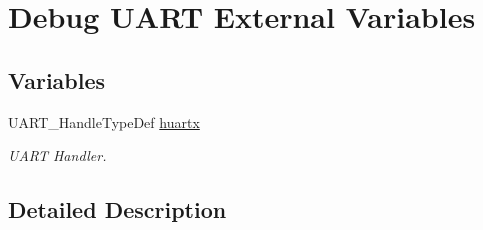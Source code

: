 \hypertarget{group___debug___u_a_r_t___external___variables}{}\section{Debug U\+A\+RT External Variables}
\label{group___debug___u_a_r_t___external___variables}
\subsection*{Variables}
\begin{DoxyCompactItemize}
\item 
U\+A\+R\+T\+\_\+\+Handle\+Type\+Def \hyperlink{group___debug___u_a_r_t___external___variables_ga988a2019125e3bb8e49b1f9195646bc6}{huartx}\hypertarget{group___debug___u_a_r_t___external___variables_ga988a2019125e3bb8e49b1f9195646bc6}{}\label{group___debug___u_a_r_t___external___variables_ga988a2019125e3bb8e49b1f9195646bc6}

\begin{DoxyCompactList}\small\item\em U\+A\+RT Handler. \end{DoxyCompactList}\end{DoxyCompactItemize}


\subsection{Detailed Description}
